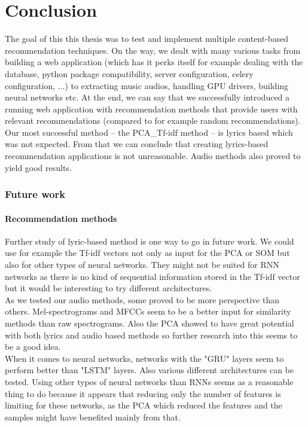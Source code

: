 \chapter*{Conclusion}
The goal of this this thesis was to test and implement multiple content-based recommendation techniques. On the way, we dealt with many various tasks from building a web application (which has it perks itself for example dealing with the database, python package compatibility, server configuration, celery configuration, ...) to extracting music audios, handling GPU drivers, building neural networks etc. At the end, we can say that we successfully introduced a running web application with recommendation methods that provide users with relevant recommendations (compared to for example random recommendations). \\
Our most successful method -- the PCA\_Tf-idf method -- is lyrics based which was not expected. From that we can conclude that creating lyrics-based recommendation applications is not unreasonable. Audio methods also proved to yield good results.

\subsection{Future work}
\subsubsection{Recommendation methods}
Further study of lyric-based method is one way to go in future work. We could use for example the Tf-idf vectors not only as input for the PCA or SOM but also for other types of neural networks. They might not be suited for RNN networks as there is no kind of sequential information stored in the Tf-idf vector but it would be interesting to try different architectures. \\
As we tested our audio methods, some proved to be more perspective than others. Mel-spectrograms and MFCCs seem to be a better input for similarity methods than raw spectrograms. Also the PCA showed to have great potential with both lyrics and audio based methods so further research into this seems to be a good idea. \\
When it comes to neural networks, networks with the "GRU" layers seem to perform better than "LSTM" layers. Also various different architectures can be tested. Using other types of neural networks than RNNs seems as a reasonable thing to do because it appears that reducing only the number of features is limiting for these networks, as the PCA which reduced the features and the samples might have benefited mainly from that. \\

